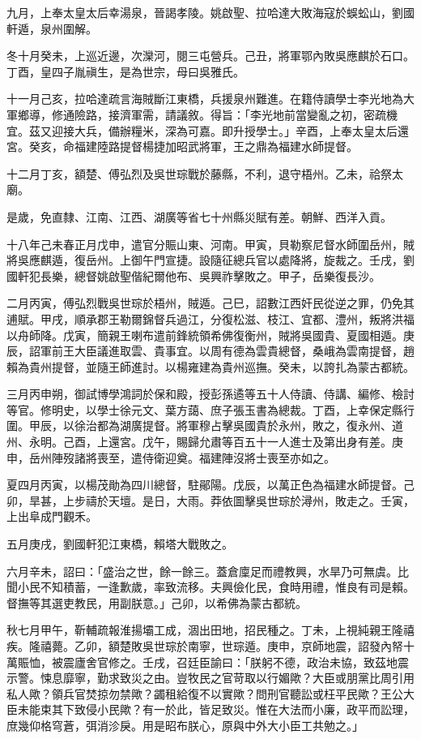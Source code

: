 \begin{pinyinscope}
九月，上奉太皇太后幸湯泉，晉謁孝陵。姚啟聖、拉哈達大敗海寇於蜈蚣山，劉國軒遁，泉州圍解。

冬十月癸未，上巡近邊，次灤河，閱三屯營兵。己丑，將軍鄂內敗吳應麒於石口。丁酉，皇四子胤禛生，是為世宗，母曰吳雅氏。

十一月己亥，拉哈達疏言海賊斷江東橋，兵援泉州難進。在籍侍讀學士李光地為大軍鄉導，修通險路，接濟軍需，請議敘。得旨：「李光地前當變亂之初，密疏機宜。茲又迎接大兵，備辦糧米，深為可嘉。即升授學士。」辛酉，上奉太皇太后還宮。癸亥，命福建陸路提督楊捷加昭武將軍，王之鼎為福建水師提督。

十二月丁亥，額楚、傅弘烈及吳世琮戰於藤縣，不利，退守梧州。乙未，祫祭太廟。

是歲，免直隸、江南、江西、湖廣等省七十州縣災賦有差。朝鮮、西洋入貢。

十八年己未春正月戊申，遣官分賑山東、河南。甲寅，貝勒察尼督水師圍岳州，賊將吳應麒遁，復岳州。上御午門宣捷。設隨征總兵官以處降將，旋裁之。壬戌，劉國軒犯長樂，總督姚啟聖偕紀爾他布、吳興祚擊敗之。甲子，岳樂復長沙。

二月丙寅，傅弘烈戰吳世琮於梧州，賊遁。己巳，詔數江西奸民從逆之罪，仍免其逋賦。甲戌，順承郡王勒爾錦督兵過江，分復松滋、枝江、宜都、澧州，叛將洪福以舟師降。戊寅，簡親王喇布遣前鋒統領希佛復衡州，賊將吳國貴、夏國相遁。庚辰，詔軍前王大臣議進取雲、貴事宜。以周有德為雲貴總督，桑峨為雲南提督，趙賴為貴州提督，並隨王師進討。以楊雍建為貴州巡撫。癸未，以誇扎為蒙古都統。

三月丙申朔，御試博學鴻詞於保和殿，授彭孫遹等五十人侍讀、侍講、編修、檢討等官。修明史，以學士徐元文、葉方藹、庶子張玉書為總裁。丁酉，上幸保定縣行圍。甲辰，以徐治都為湖廣提督。將軍穆占擊吳國貴於永州，敗之，復永州、道州、永明。己酉，上還宮。戊午，賜歸允肅等百五十一人進士及第出身有差。庚申，岳州陣歿諸將喪至，遣侍衛迎奠。福建陣沒將士喪至亦如之。

夏四月丙寅，以楊茂勛為四川總督，駐鄖陽。戊辰，以萬正色為福建水師提督。己卯，旱甚，上步禱於天壇。是日，大雨。莽依圖擊吳世琮於潯州，敗走之。壬寅，上出阜成門觀禾。

五月庚戌，劉國軒犯江東橋，賴塔大戰敗之。

六月辛未，詔曰：「盛治之世，餘一餘三。蓋倉廩足而禮教興，水旱乃可無虞。比聞小民不知積蓄，一逢歉歲，率致流移。夫興儉化民，食時用禮，惟良有司是賴。督撫等其選吏教民，用副朕意。」己卯，以希佛為蒙古都統。

秋七月甲午，靳輔疏報淮揚壩工成，涸出田地，招民種之。丁未，上視純親王隆禧疾。隆禧薨。乙卯，額楚敗吳世琮於南寧，世琮遁。庚申，京師地震，詔發內帑十萬賑恤，被震廬舍官修之。壬戌，召廷臣諭曰：「朕躬不德，政治未協，致茲地震示警。悚息靡寧，勤求致災之由。豈牧民之官苛取以行媚歟？大臣或朋黨比周引用私人歟？領兵官焚掠勿禁歟？蠲租給復不以實歟？問刑官聽訟或枉平民歟？王公大臣未能束其下致侵小民歟？有一於此，皆足致災。惟在大法而小廉，政平而訟理，庶幾仰格穹蒼，弭消沴戾。用是昭布朕心，原與中外大小臣工共勉之。」


\end{pinyinscope}
